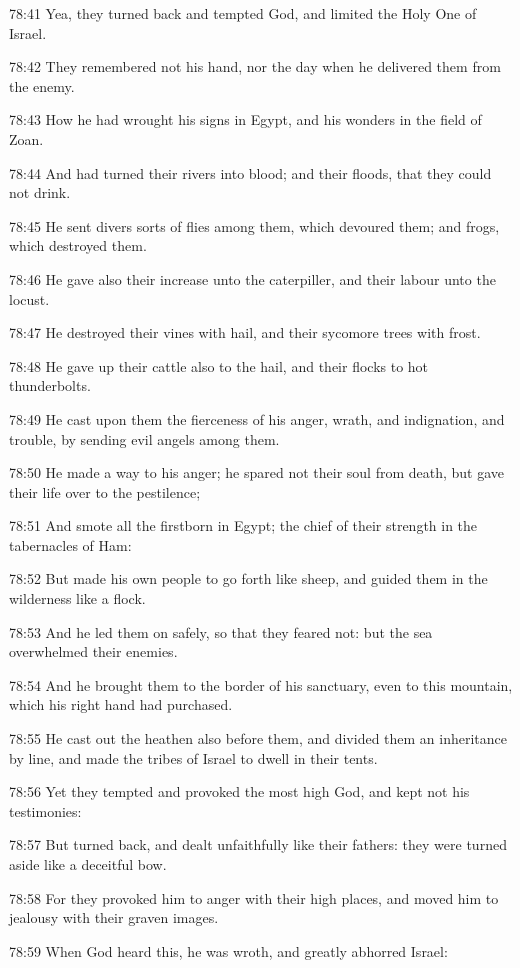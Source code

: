 78:41 Yea, they turned back and tempted God, and limited the Holy One
of Israel.

78:42 They remembered not his hand, nor the day when he delivered them
from the enemy.

78:43 How he had wrought his signs in Egypt, and his wonders in the
field of Zoan.

78:44 And had turned their rivers into blood; and their floods, that
they could not drink.

78:45 He sent divers sorts of flies among them, which devoured them;
and frogs, which destroyed them.

78:46 He gave also their increase unto the caterpiller, and their
labour unto the locust.

78:47 He destroyed their vines with hail, and their sycomore trees
with frost.

78:48 He gave up their cattle also to the hail, and their flocks to
hot thunderbolts.

78:49 He cast upon them the fierceness of his anger, wrath, and
indignation, and trouble, by sending evil angels among them.

78:50 He made a way to his anger; he spared not their soul from death,
but gave their life over to the pestilence;

78:51 And smote all the firstborn in Egypt; the chief of their
strength in the tabernacles of Ham:

78:52 But made his own people to go forth like sheep, and guided them
in the wilderness like a flock.

78:53 And he led them on safely, so that they feared not: but the sea
overwhelmed their enemies.

78:54 And he brought them to the border of his sanctuary, even to this
mountain, which his right hand had purchased.

78:55 He cast out the heathen also before them, and divided them an
inheritance by line, and made the tribes of Israel to dwell in their
tents.

78:56 Yet they tempted and provoked the most high God, and kept not
his testimonies:

78:57 But turned back, and dealt unfaithfully like their fathers: they
were turned aside like a deceitful bow.

78:58 For they provoked him to anger with their high places, and moved
him to jealousy with their graven images.

78:59 When God heard this, he was wroth, and greatly abhorred Israel:

